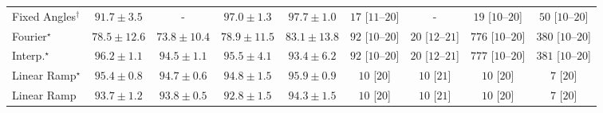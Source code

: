 \begin{tabular}{l|cccc|cccc|}
Fixed Angles$^\dagger$ & {\cellcolor[HTML]{045E93}} \color[HTML]{F1F1F1} $91.7\pm 3.5$ & {\cellcolor[HTML]{000000}} \color[HTML]{F1F1F1} {\cellcolor{white}} \color{black} - & {\cellcolor[HTML]{023F64}} \color[HTML]{F1F1F1} $97.0\pm 1.3$ & {\cellcolor[HTML]{023B5D}} \color[HTML]{F1F1F1} $97.7\pm 1.0$ & {\cellcolor[HTML]{FFF3F0}} \color[HTML]{000000} $17$ [$11$--$20$] & {\cellcolor[HTML]{000000}} \color[HTML]{F1F1F1} {\cellcolor{white}} \color{black} - & {\cellcolor[HTML]{FFF3F0}} \color[HTML]{000000} $19$ [$10$--$20$] & {\cellcolor[HTML]{FEEBE8}} \color[HTML]{000000} $50$ [$10$--$20$] \\
Fourier$^\star$ & {\cellcolor[HTML]{529BC7}} \color[HTML]{F1F1F1} $78.5\pm 12.6$ & {\cellcolor[HTML]{81AED2}} \color[HTML]{F1F1F1} $73.8\pm 10.4$ & {\cellcolor[HTML]{4E9AC6}} \color[HTML]{F1F1F1} $78.9\pm 11.5$ & {\cellcolor[HTML]{2685BB}} \color[HTML]{F1F1F1} $83.1\pm 13.8$ & {\cellcolor[HTML]{FDE1DE}} \color[HTML]{000000} $92$ [$10$--$20$] & {\cellcolor[HTML]{FFF3EF}} \color[HTML]{000000} $20$ [$12$--$21$] & {\cellcolor[HTML]{49006A}} \color[HTML]{F1F1F1} $776$ [$10$--$20$] & {\cellcolor[HTML]{F76CA3}} \color[HTML]{F1F1F1} $380$ [$10$--$20$] \\
Interp.$^\star$ & {\cellcolor[HTML]{03456C}} \color[HTML]{F1F1F1} $96.2\pm 1.1$ & {\cellcolor[HTML]{034E7B}} \color[HTML]{F1F1F1} $94.5\pm 1.1$ & {\cellcolor[HTML]{034973}} \color[HTML]{F1F1F1} $95.5\pm 4.1$ & {\cellcolor[HTML]{045585}} \color[HTML]{F1F1F1} $93.4\pm 6.2$ & {\cellcolor[HTML]{FDE1DE}} \color[HTML]{000000} $92$ [$10$--$20$] & {\cellcolor[HTML]{FFF3EF}} \color[HTML]{000000} $20$ [$12$--$21$] & {\cellcolor[HTML]{49006A}} \color[HTML]{F1F1F1} $777$ [$10$--$20$] & {\cellcolor[HTML]{F76CA3}} \color[HTML]{F1F1F1} $381$ [$10$--$20$] \\
Linear Ramp$^\star$ & {\cellcolor[HTML]{034973}} \color[HTML]{F1F1F1} $95.4\pm 0.8$ & {\cellcolor[HTML]{034D79}} \color[HTML]{F1F1F1} $94.7\pm 0.6$ & {\cellcolor[HTML]{034D79}} \color[HTML]{F1F1F1} $94.8\pm 1.5$ & {\cellcolor[HTML]{03466E}} \color[HTML]{F1F1F1} $95.9\pm 0.9$ & {\cellcolor[HTML]{FFF6F2}} \color[HTML]{000000} $10$ [$20$] & {\cellcolor[HTML]{FFF6F2}} \color[HTML]{000000} $10$ [$21$] & {\cellcolor[HTML]{FFF6F2}} \color[HTML]{000000} $10$ [$20$] & {\cellcolor[HTML]{FFF6F2}} \color[HTML]{000000} $7$ [$20$] \\
Linear Ramp & {\cellcolor[HTML]{045483}} \color[HTML]{F1F1F1} $93.7\pm 1.2$ & {\cellcolor[HTML]{045382}} \color[HTML]{F1F1F1} $93.8\pm 0.5$ & {\cellcolor[HTML]{04598C}} \color[HTML]{F1F1F1} $92.8\pm 1.5$ & {\cellcolor[HTML]{034F7D}} \color[HTML]{F1F1F1} $94.3\pm 1.5$ & {\cellcolor[HTML]{FFF6F2}} \color[HTML]{000000} $10$ [$20$] & {\cellcolor[HTML]{FFF6F2}} \color[HTML]{000000} $10$ [$21$] & {\cellcolor[HTML]{FFF6F2}} \color[HTML]{000000} $10$ [$20$] & {\cellcolor[HTML]{FFF6F2}} \color[HTML]{000000} $7$ [$20$] \\

\end{tabular}
